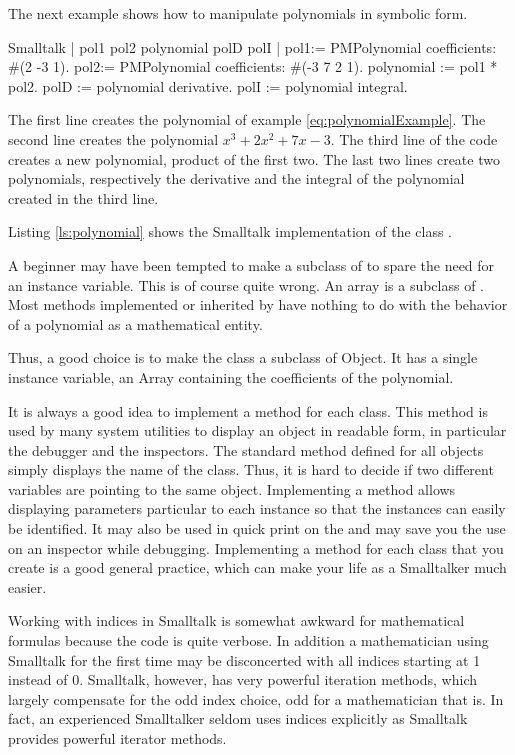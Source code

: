 The next example shows how to manipulate polynomials in symbolic form.
\begin{listing}{Smalltalk}
{ }
| pol1 pol2 polynomial polD polI |
pol1:= PMPolynomial coefficients: #(2 -3 1).
pol2:= PMPolynomial coefficients: #(-3 7 2 1).
polynomial := pol1 * pol2.
polD := polynomial derivative.
polI := polynomial integral.
\end{listing}
The first line creates the  polynomial of example
\ref{eq:polynomialExample}. The second line creates the polynomial
$x^3+2x^2+7x-3$. The third line of the code creates a new
polynomial, product of the first two. The last two lines create
two polynomials, respectively the derivative and the integral of
the polynomial created in the third line.

Listing \ref{ls:polynomial} shows the Smalltalk implementation of
the class .

A beginner may have been tempted to make  a subclass of  to spare the need for an instance variable.
This is of course quite wrong.
An array is a subclass of .
Most methods implemented or inherited by  have nothing to do with the behavior of a polynomial as a mathematical entity.

Thus, a good choice is to make the class  a
subclass of Object. It has a single instance variable, an Array
containing the coefficients of the polynomial.

It is always a good idea to implement a method  for
each class. This method is used by many system utilities to
display an object in readable form, in particular the debugger and
the inspectors. The standard method defined for all objects simply
displays the name of the class. Thus, it is hard to decide if two
different variables are pointing to the same object. Implementing
a method  allows displaying parameters particular to
each instance so that the instances can easily be identified. It
may also be used in quick print on the  and may
save you the use on an inspector while debugging. Implementing a
method  for each class that you create is a good
general practice, which can make your life as a Smalltalker much
easier.

Working with indices in Smalltalk is somewhat awkward for
mathematical formulas because the code is quite verbose. In
addition a mathematician using Smalltalk for the first time may be
disconcerted with all indices starting at 1 instead of 0.
Smalltalk, however, has very powerful iteration methods, which
largely compensate for the odd index choice, odd for a
mathematician that is. In fact, an experienced Smalltalker seldom
uses indices explicitly as Smalltalk provides powerful iterator
methods.


